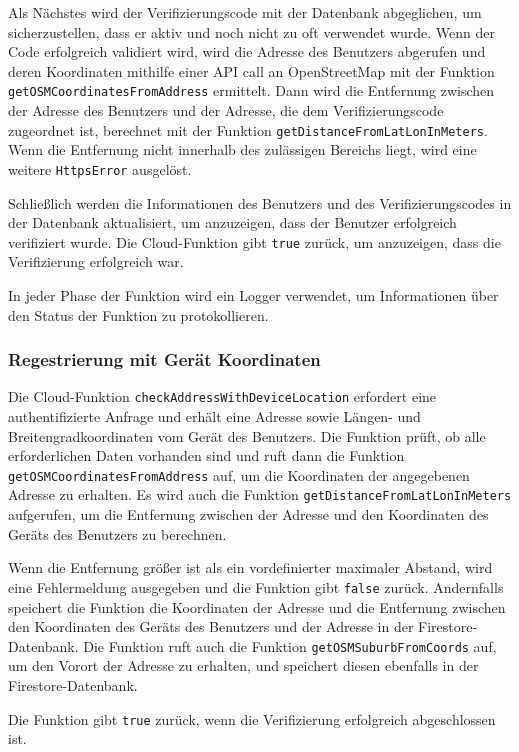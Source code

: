 Als Nächstes wird der Verifizierungscode mit der Datenbank abgeglichen, um sicherzustellen, dass er aktiv und noch nicht zu oft verwendet wurde. Wenn der Code erfolgreich validiert wird, wird die Adresse des Benutzers abgerufen und deren Koordinaten mithilfe einer API call an OpenStreetMap mit der Funktion \texttt{getOSMCoordinatesFromAddress} ermittelt. Dann wird die Entfernung zwischen der Adresse des Benutzers und der Adresse, die dem Verifizierungscode zugeordnet ist, berechnet mit der Funktion \texttt{getDistanceFromLatLonInMeters}. Wenn die Entfernung nicht innerhalb des zulässigen Bereichs liegt, wird eine weitere \texttt{HttpsError} ausgelöst.

Schließlich werden die Informationen des Benutzers und des Verifizierungscodes in der Datenbank aktualisiert, um anzuzeigen, dass der Benutzer erfolgreich verifiziert wurde. Die Cloud-Funktion gibt \texttt{true} zurück, um anzuzeigen, dass die Verifizierung erfolgreich war.

In jeder Phase der Funktion wird ein Logger verwendet, um Informationen über den Status der Funktion zu protokollieren.

\subsubsection{Regestrierung mit Gerät Koordinaten}

Die Cloud-Funktion \texttt{checkAddressWithDeviceLocation} erfordert eine authentifizierte Anfrage und erhält eine Adresse sowie Längen- und Breitengradkoordinaten vom Gerät des Benutzers. Die Funktion prüft, ob alle erforderlichen Daten vorhanden sind und ruft dann die Funktion \texttt{getOSMCoordinatesFromAddress} auf, um die Koordinaten der angegebenen Adresse zu erhalten. Es wird auch die Funktion \texttt{getDistanceFromLatLonInMeters} aufgerufen, um die Entfernung zwischen der Adresse und den Koordinaten des Geräts des Benutzers zu berechnen.

Wenn die Entfernung größer ist als ein vordefinierter maximaler Abstand, wird eine Fehlermeldung ausgegeben und die Funktion gibt \texttt{false} zurück. Andernfalls speichert die Funktion die Koordinaten der Adresse und die Entfernung zwischen den Koordinaten des Geräts des Benutzers und der Adresse in der Firestore-Datenbank. Die Funktion ruft auch die Funktion \texttt{getOSMSuburbFromCoords} auf, um den Vorort der Adresse zu erhalten, und speichert diesen ebenfalls in der Firestore-Datenbank.

Die Funktion gibt \texttt{true} zurück, wenn die Verifizierung erfolgreich abgeschlossen ist.

